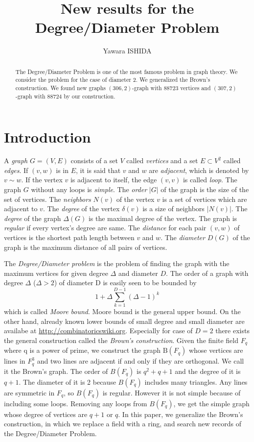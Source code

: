 \documentclass{article}
\title{New results for the Degree/Diameter Problem}
\author{Yawara ISHIDA}
\newcommand{\B}{\mathrm{B}}
\begin{document}
\maketitle
\begin{abstract}
The Degree/Diameter Problem is one of the most famous problem in graph theory. 
We consider the problem for the case of diameter 2.
We generalized the Brown's construction.
We found new graphs $(306,2)$-graph with $88723$ vertices and $(307,2)$-graph with $88724$ by our construction.
\end{abstract}

\section{Introduction}
A {\it graph} $G=(V,E)$ consists of a set $V$ called {\it vertices} and a set $E \subset V^2$ called {\it edges}.
If $(v,w)$ is in $E$, it is said that $v$ and $w$ are {\it adjacent}, which is denoted by $v \sim w$.
If the vertex $v$ is adjacent to itself, the edge $(v,v)$ is called {\it loop}.
The graph $G$ without any loops is {\it simple}.
The {\it order} $|G|$ of the graph is the size of the set of vertices. 
The {\it neighbors} $N(v)$ of the vertex $v$ is a set of vertices which are adjacent to $v$.
The {\it degree} of the vertex $\delta(v)$ is a size of neighbors $| N(v) |$.  
The {\it degree} of the graph $\Delta(G)$ is the maximal degree  of the vertex.
The graph is {\it regular} if every vertex's degree are same.
The {\it distance} for each pair $(v,w)$ of vertices is the shortest path length between $v$ and $w$. 
The {\it diameter} $D(G)$ of the graph is the  maximum distance of all pairs of vertices. 

The {\it Degree/Diameter problem} is the problem of finding the graph with the maximum vertices for given degree $\Delta$ and diameter $D$. 
The order of a graph with degree $\Delta$ ($\Delta > 2$) of diameter D is easily seen to be bounded by 
\[ 1 + \Delta \sum_{k=1}^{D-1} (\Delta - 1)^k\]
which is called {\it Moore bound}.
Moore bound is the general upper bound. On the other hand, already known lower bounds of small degree and small diameter are availabe at \url{http://combinatoricswiki.org}. 
Especially for case of $D=2$ there exists the general construction called the {\it Brown's construction}.
Given the finite field $F_q$ where q is a power of prime, we construct the graph $\B(F_q)$ whose vertices are lines in $F_q^3$ and two lines are adjacent if and only if they are orthogonal. 
We call it the Brown's graph.
The order of $B(F_q)$ is $q^2+q+1$ and the degree of it is $q+1$. The diameter of it is 2 because $B(F_q)$ includes many triangles. 
Any lines are symmetric in $F_q$, so $B(F_q)$ is regular. However it is not simple because of including some loops. 
Removing any loops from $B(F_q)$, we get the simple graph whose degree of vertices are $q+1$ or $q$. 
In this paper, we generalize the Brown's construction, in which we replace a field with a ring, and search new records of the Degree/Diameter Problem.
\end{document}
